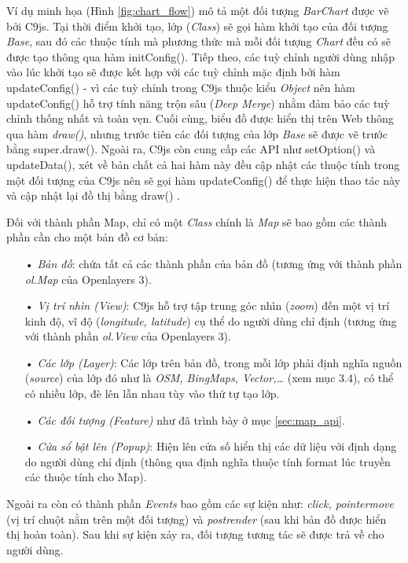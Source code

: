 \documentclass[12pt,a4paper]{article}
\begin{document}
Ví dụ minh họa (Hình \ref{fig:chart_flow}) mô tả một đối tượng \textit{BarChart} được vẽ bởi C9js. Tại thời điểm khởi tạo, lớp (\textit{Class}) sẽ gọi hàm khởi tạo của đối tượng \textit{Base}, sau đó các thuộc tính mà phương thức mà mỗi đối tượng \textit{Chart} đều có sẽ được tạo thông qua hàm \textsf{initConfig()}. Tiếp theo, các tuỳ chỉnh người dùng nhập vào lúc khởi tạo sẽ được kết hợp với các tuỳ chỉnh mặc định bởi hàm \textsf{updateConfig()} - vì các tuỳ chỉnh trong C9js thuộc kiểu \textit{Object} nên hàm \textsf{updateConfig()} hỗ trợ tính năng trộn sâu (\textit{Deep Merge})\cite{merge_deep} nhằm đảm bảo các tuỳ chỉnh thống nhất và toàn vẹn. Cuối cùng, biểu đồ được hiển thị trên Web thông qua hàm \textit{draw()}, nhưng trước tiên các đối tượng của lớp \textit{Base} sẽ được vẽ trước bằng \textsf{super.draw()}. Ngoài ra, C9js còn cung cấp các API như \textsf{setOption()} và \textsf{updateData()}, xét về bản chất cả hai hàm này đều cập nhật các thuộc tính trong một đối tượng của C9js nên sẽ gọi hàm \textsf{updateConfig()} để thực hiện thao tác này và cập nhật lại đồ thị bằng \textsf{draw()} .

Đối với thành phần Map, chỉ có một \textit{Class} chính là \textit{Map} sẽ bao gồm các thành phần cần cho một bản đồ cơ bản:
\begin{itemize}
\item[•] \emph{Bản đồ}: chứa tất cả các thành phần của bản đồ (tương ứng với thành phần \textit{ol.Map} của Openlayers 3).
\item[•] \emph{Vị trí nhìn (View)}: C9js hỗ trợ tập trung góc nhìn (\textit{zoom}) đến một vị trí kinh độ, vĩ độ (\textit{longitude, latitude}) cụ thể do người dùng chỉ định (tương ứng với thành phần \textit{ol.View} của Openlayers 3).
\item[•] \emph{Các lớp (Layer)}: Các lớp trên bản đồ, trong mỗi lớp phải định nghĩa nguồn (\textit{source}) của lớp đó như là \textit{OSM, BingMaps, Vector,…} (xem mục 3.4), có thể có nhiều lớp, đè lên lẫn nhau tùy vào thứ tự tạo lớp.
\item[•] \emph{Các đối tượng (Feature)} như đã trình bày ở mục \ref{sec:map_api}.
\item[•] \emph{Cửa sổ bật lên (Popup)}: Hiện lên cửa số hiển thị các dữ liệu với định dạng do người dùng chỉ định (thông qua định nghĩa thuộc tính format lúc truyền các thuộc tính cho Map).
\end{itemize}

Ngoài ra còn có thành phần \textit{Events} bao gồm các sự kiện như: \textit{click, pointermove} (vị trí chuột nằm trên một đối tượng) và \textit{postrender} (sau khi bản đồ được hiển thị hoàn toàn). Sau khi sự kiện xảy ra, đối tượng tương tác sẽ được trả về cho người dùng.
\end{document}
